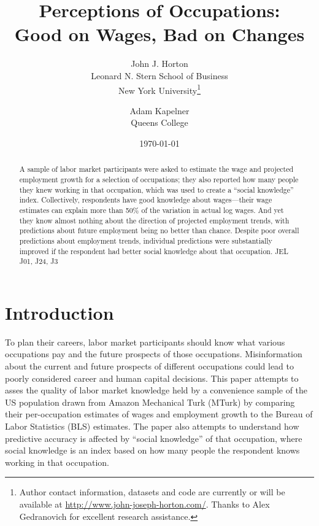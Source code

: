\documentclass[12pt]{article}
\begin{document}
 

\title{Perceptions of Occupations: \\ Good on Wages, Bad on Changes}

\date{\today}

\author{John J. Horton \\ Leonard N. Stern School of Business \\ New
  York University\footnote{Author contact information, datasets and
    code are currently or will be available at
    \href{http://www.john-joseph-horton.com/}{http://www.john-joseph-horton.com/}. 
    Thanks to Alex Gedranovich for excellent research assistance. 
} \and Adam Kapelner\\Queens College}
\maketitle

\begin{abstract}
\noindent  
A sample of labor market participants were asked to estimate the wage and projected employment growth for a selection of occupations;
they also reported how many people they knew working in that occupation, which was used to create a ``social knowledge'' index. 
Collectively, respondents have good knowledge about wages---their wage estimates can explain more than 50\% of the variation in actual log wages.
And yet they know almost nothing about the direction of projected employment trends, with predictions about future employment being no better than chance. 
Despite poor overall predictions about employment trends, individual predictions were substantially improved if the respondent had better social knowledge about that occupation.
\newline 
\newline 
\noindent JEL J01, J24, J3
\end{abstract} 


\section{Introduction}
To plan their careers, labor market participants should know what various occupations pay and the future prospects of those occupations. 
Misinformation about the current and future prospects of different occupations could lead to poorly considered career and human capital decisions. 
This paper attempts to asses the quality of labor market knowledge
held by a convenience sample of the US population drawn from Amazon Mechanical Turk (MTurk) by comparing their per-occupation estimates of wages and employment growth to the Bureau of Labor Statistics (BLS) estimates. 
The paper also attempts to understand how predictive accuracy is affected by ``social knowledge'' of that occupation, where social knowledge is an index based on how many people the respondent knows working in that occupation.
\end{document}
